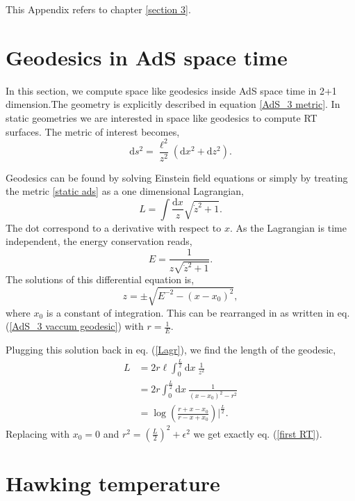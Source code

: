 This Appendix refers to chapter \ref{section 3}.

\section{Geodesics in AdS space time}

In this section, we compute space like geodesics inside AdS space time in 2+1 dimension.The geometry is explicitly described in equation \ref{AdS_3 metric}. In static geometries we are interested in space like geodesics to compute RT surfaces. The metric of interest becomes,
\begin{equation}\label{static ads}
    \text{d}s^2= \frac{\ell^2}{z^2}\left(\text{d}x^2+\text{d}z^2\right).
\end{equation}

Geodesics can be found by solving Einstein field equations or simply by treating the metric \ref{static ads} as a one dimensional Lagrangian,
\begin{equation}\label{Lagr}
    L = \int\frac{\text{d}x}{z}\sqrt{\dot z^2+1}.
\end{equation}
The dot correspond to a derivative with respect to $x$. As the Lagrangian is time independent, the energy conservation reads,
\begin{equation}
    E = \frac{1}{z\sqrt{\dot z^2+1}}.
\end{equation}
The solutions of this differential equation is,
\begin{equation}
    z = \pm \sqrt{E^{-2}-(x-x_0)^2},
\end{equation}
where $x_0$ is a constant of integration. This can be rearranged in as written in eq. (\ref{AdS_3 vaccum geodesic}) with $r=\frac{1}{E}$.

Plugging this solution back in eq. (\ref{Lagr}), we find the length of the geodesic,
\begin{align}
    L &= 2r\ell \int_0^\frac{L}{2} \text{d}x ~ \frac{1}{z^2}\\
    &= 2r \int_0^\frac{L}{2} \text{d}x ~ \frac{1}{(x-x_0)^2-r^2}\\
    &= \log\left(\frac{r+x-x_0}{r-x+x_0}\right)\Big|^\frac{L}{2}.
\end{align}
Replacing with $x_0 = 0$ and $r^2 = \left(\frac{L}{2}\right)^2+\epsilon^2$ we get exactly eq. (\ref{first RT}).

\section{Hawking temperature}

